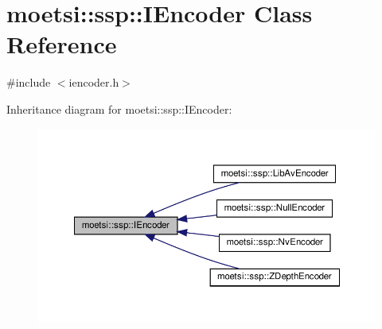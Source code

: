 \hypertarget{classmoetsi_1_1ssp_1_1IEncoder}{}\section{moetsi\+:\+:ssp\+:\+:I\+Encoder Class Reference}
\label{classmoetsi_1_1ssp_1_1IEncoder}


{\ttfamily \#include $<$iencoder.\+h$>$}



Inheritance diagram for moetsi\+:\+:ssp\+:\+:I\+Encoder\+:
\nopagebreak
\begin{figure}[H]
\begin{center}
\leavevmode
\includegraphics[width=350pt]{classmoetsi_1_1ssp_1_1IEncoder__inherit__graph}
\end{center}
\end{figure}
